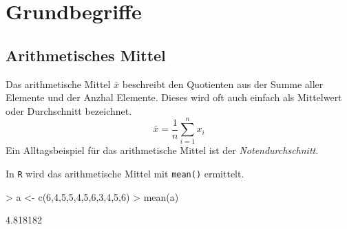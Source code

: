 



\chapter{Grundbegriffe}
\newpage

\section{Arithmetisches Mittel}
Das arithmetische Mittel $\bar{x}$ beschreibt den Quotienten aus 
der Summe aller Elemente und der Anzhal Elemente. Dieses wird oft auch
einfach als Mittelwert oder Durchschnitt bezeichnet.
\[ 
	\bar{x} = \frac{1}{n} \sum_{i=1}^{n} x_i
\]
Ein Alltagsbeispiel für das arithmetische Mittel ist der 
\emph{Notendurchschnitt}. 

In \lstinline{R} wird das arithmetische Mittel mit 
\lstinline{mean()} ermittelt.
\begin{Schunk}
\begin{Sinput}
> a <- c(6,4,5,5,4,5,6,3,4,5,6)
> mean(a)
\end{Sinput}
\begin{Soutput}
[1] 4.818182
\end{Soutput}
\end{Schunk}

